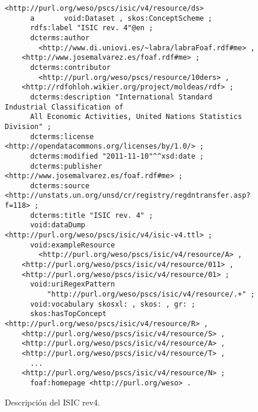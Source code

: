 \begin{figure}[!htp]
\begin{lstlisting} 
<http://purl.org/weso/pscs/isic/v4/resource/ds>
      a       void:Dataset , skos:ConceptScheme ;
      rdfs:label "ISIC rev. 4"@en ;
      dcterms:author 
        <http://www.di.uniovi.es/~labra/labraFoaf.rdf#me> , 
	<http://www.josemalvarez.es/foaf.rdf#me> ;
      dcterms:contributor
        <http://purl.org/weso/pscs/resource/10ders> ,
	<http://rdfohloh.wikier.org/project/moldeas/rdf> ; 
      dcterms:description "International Standard Industrial Classification of 
	  All Economic Activities, United Nations Statistics Division" ;
      dcterms:license <http://opendatacommons.org/licenses/by/1.0/> ;
      dcterms:modified "2011-11-10"^^xsd:date ;
      dcterms:publisher <http://www.josemalvarez.es/foaf.rdf#me> ;
      dcterms:source <http://unstats.un.org/unsd/cr/registry/regdntransfer.asp?f=118> ;
      dcterms:title "ISIC rev. 4" ;
      void:dataDump <http://purl.org/weso/pscs/isic/v4/isic-v4.ttl> ;
      void:exampleResource
        <http://purl.org/weso/pscs/isic/v4/resource/A> , 
	<http://purl.org/weso/pscs/isic/v4/resource/011> , 
	<http://purl.org/weso/pscs/isic/v4/resource/01> ;
      void:uriRegexPattern
          "http://purl.org/weso/pscs/isic/v4/resource/.+" ;
      void:vocabulary skosxl: , skos: , gr: ;
      skos:hasTopConcept <http://purl.org/weso/pscs/isic/v4/resource/R> , 
	<http://purl.org/weso/pscs/isic/v4/resource/S> , 
	<http://purl.org/weso/pscs/isic/v4/resource/A> , 
	<http://purl.org/weso/pscs/isic/v4/resource/T> , 
	  ...
	<http://purl.org/weso/pscs/isic/v4/resource/N> ;
      foaf:homepage <http://purl.org/weso> .
\end{lstlisting}
	\caption{Descripción del \dataset ISIC rev4.}
	\label{fig:pscs-ds-cpa-2008}
\end{figure}



